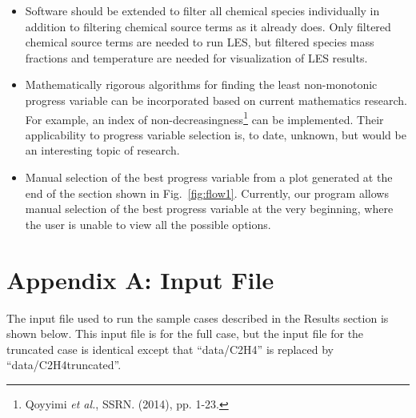 \documentclass[11pt]{article}
\begin{document}
\begin{itemize}
\item Software should be extended to filter all chemical species
  individually in addition to filtering chemical source terms as it
  already does. Only filtered chemical source terms are needed to run
  LES, but filtered species mass fractions and temperature are needed
  for visualization of LES results.
\item Mathematically rigorous algorithms for finding the least
  non-monotonic progress variable can be incorporated based on current
  mathematics research. For example, an index of
  non-decreasingness\footnote{Qoyyimi \textit{et al.}, SSRN. (2014),
    pp. 1-23.} can be implemented. Their applicability to progress
  variable selection is, to date, unknown, but would be an interesting
  topic of research.
\item Manual selection of the best progress variable from a plot
  generated at the end of the section shown in
  Fig.~\ref{fig:flow1}. Currently, our program allows manual selection
  of the best progress variable at the very beginning, where the user
  is unable to view all the possible options.
\end{itemize}


\clearpage
\section*{Appendix A: Input File}

The input file used to run the sample cases described in the Results
section is shown below. This input file is for the full case, but the
input file for the truncated case is identical except that “data/C2H4”
is replaced by “data/C2H4truncated”.

\vspace{12pt}
\end{document}
